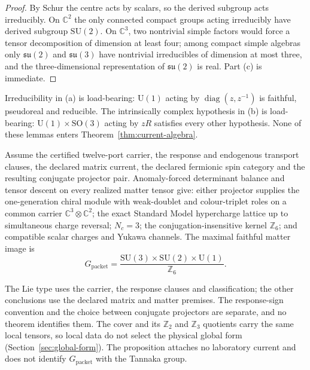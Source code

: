 \documentclass[11pt]{article}
\begin{document}
\begin{proof}
By Schur the centre acts by scalars, so the derived subgroup acts
irreducibly. On \(\mathbb C^2\) the only connected compact groups acting
irreducibly have derived subgroup \(\mathrm{SU}(2)\). On \(\mathbb C^3\), two
nontrivial simple factors would force a tensor decomposition of dimension at
least four; among compact simple algebras only \(\mathfrak{su}(2)\) and
\(\mathfrak{su}(3)\) have nontrivial irreducibles of dimension at most three,
and the three-dimensional representation of \(\mathfrak{su}(2)\) is real.
Part (c) is immediate.
\end{proof}

Irreducibility in (a) is load-bearing: \(\mathrm U(1)\) acting by
\(\operatorname{diag}(z,z^{-1})\) is faithful, pseudoreal and reducible. The
intrinsically complex hypothesis in (b) is load-bearing:
\(\mathrm U(1)\times\mathrm{SO}(3)\) acting by \(zR\) satisfies every other
hypothesis. None of these lemmas enters Theorem~\ref{thm:current-algebra}.

\begin{proposition}
\label{prop:conditional-matter-image}
Assume the certified twelve-port carrier, the response and endogenous
transport clauses, the declared matrix current, the declared fermionic spin
category and the resulting conjugate projector pair. Anomaly-forced
determinant balance and tensor descent on every realized matter tensor give:
either projector supplies the one-generation chiral module with weak-doublet
and colour-triplet roles on a common carrier \(\mathbb C^3\otimes\mathbb C^2\);
the exact Standard Model hypercharge lattice up to simultaneous charge
reversal; \(N_c=3\); the conjugation-insensitive kernel \(\mathbb Z_6\); and
compatible scalar charges and Yukawa channels. The maximal faithful matter
image is
\[
G_{\mathrm{packet}}=
\frac{\mathrm{SU}(3)\times\mathrm{SU}(2)\times\mathrm U(1)}{\mathbb Z_6}.
\]
\end{proposition}

The Lie type uses the carrier, the response clauses and classification; the
other conclusions use the declared matrix and matter premises. The
response-sign convention and the choice between conjugate projectors are
separate, and no theorem identifies them. The cover and its
\(\mathbb Z_2\) and \(\mathbb Z_3\) quotients carry the same local tensors, so
local data do not select the physical global form
(Section~\ref{sec:global-form}). The proposition attaches no laboratory
current and does not identify \(G_{\mathrm{packet}}\) with the Tannaka group.
\end{document}
